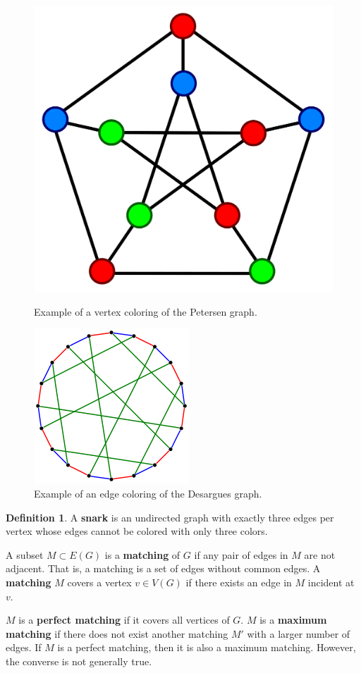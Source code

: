 \documentclass[11pt]{article}
\theoremstyle{definition}
\newtheorem{defn}{Definition}
\begin{document}
\begin{figure}[H]
   \begin{minipage}{0.45\textwidth}
     \centering
     \includegraphics[width=.5\linewidth]{images/vertex_coloring.jpeg}
     \caption{Example of a vertex coloring of the Petersen graph.}\label{fig:vertex_coloring}
   \end{minipage}\hfill
   \begin{minipage}{0.5\textwidth}
     \centering
     \includegraphics[width=.45\linewidth]{images/edge_coloring.jpeg}
     \caption{Example of an edge coloring of the Desargues graph.}\label{fig:vertex_coloring}
   \end{minipage}
\end{figure}

\begin{defn} \label{snark}
A \textbf{snark} is an undirected graph with exactly three edges per vertex whose edges cannot be colored with only three colors. 
\end{defn}

A subset $M \subset E(G)$ is a \textbf{matching} of $G$ if any pair of edges in $M$ are not adjacent. That is, a matching is a set of edges without common edges. A \textbf{matching} $M$ covers a vertex $v \in V(G)$ if there exists an edge in $M$ incident at $v$.

$M$ is a \textbf{perfect matching} if it covers all vertices of $G$. $M$ is a \textbf{maximum matching} if there does not exist another matching $M'$ with a larger number of edges. If $M$ is a perfect matching, then it is also a maximum matching. However, the converse is not generally true.
\end{document}
